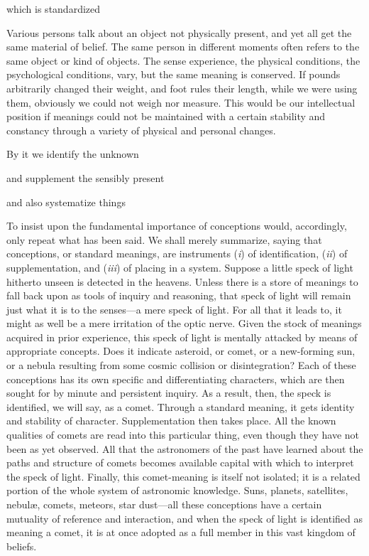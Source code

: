 \documentclass[letterpaper]{book}
\begin{document}
which is standardized

Various persons talk about an object not physically present, and yet all
get the same material of belief. The same person in different moments
often refers to the same object or kind of objects. The sense
experience, the physical conditions, the psychological conditions, vary,
but the same meaning is conserved. If
pounds
arbitrarily changed their weight, and foot rules their length, while we
were using them, obviously we could not weigh nor measure. This would be
our intellectual position if meanings could not be maintained with a
certain stability and constancy through a variety of physical and
personal changes.

By it we identify the unknown

and supplement the sensibly present

and also systematize things

To insist upon the fundamental importance of conceptions would,
accordingly, only repeat what has been said. We shall merely summarize,
saying that conceptions, or standard meanings, are instruments
(\emph{i}) of identification, (\emph{ii}) of supplementation, and
(\emph{iii}) of placing in a system. Suppose a little speck of light
hitherto unseen is detected in the heavens. Unless there is a store of
meanings to fall back upon as tools of inquiry and reasoning, that speck
of light will remain just what it is to the senses---a mere speck of
light. For all that it leads to, it might as well be a mere irritation
of the optic nerve. Given the stock of meanings acquired in prior
experience, this speck of light is mentally attacked by means of
appropriate concepts. Does it indicate asteroid, or comet, or a
new-forming sun, or a nebula resulting from some cosmic collision or
disintegration? Each of these conceptions has its own specific and
differentiating characters, which are then sought for by minute and
persistent inquiry. As a result, then, the speck is identified, we will
say, as a comet. Through a standard meaning, it gets identity and
stability of character. Supplementation then takes place. All the known
qualities of comets are read into this particular thing, even though
they have not been as yet observed. All that the astronomers of the past
have learned about the paths and structure of comets becomes available
capital with which to interpret the
speck
of light. Finally, this comet-meaning is itself not isolated; it is a
related portion of the whole system of astronomic knowledge. Suns,
planets, satellites, nebulæ, comets, meteors, star dust---all these
conceptions have a certain mutuality of reference and interaction, and
when the speck of light is identified as meaning a comet, it is at once
adopted as a full member in this vast kingdom of beliefs.
\end{document}
